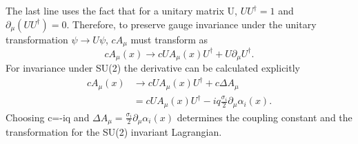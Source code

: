 The last line uses the fact that for a unitary matrix U, $UU^\dagger = 1$ and $\partial_\mu(UU^\dagger) = 0$. Therefore, to preserve gauge invariance under the unitary transformation $\psi \rightarrow U\psi$, $cA_\mu$ must transform as
\begin{equation}
cA_\mu(x) \rightarrow cUA_\mu(x)U^\dagger + U\partial_\mu U^\dagger .
\end{equation}
For invariance under SU(2) the derivative can be calculated explicitly
\begin{equation}
\begin{split}
cA_\mu(x) &\rightarrow cUA_\mu(x)U^\dagger + c\Delta A_\mu \\ 
&= cUA_\mu(x)U^\dagger - iq\frac{\sigma_i}{2}\partial_\mu\alpha_i(x).
\end{split}
\end{equation}
Choosing c=-iq and $\Delta A_\mu = \frac{\sigma_i}{2}\partial_\mu\alpha_i(x)$ determines the coupling constant and the transformation for the SU(2) invariant Lagrangian.

